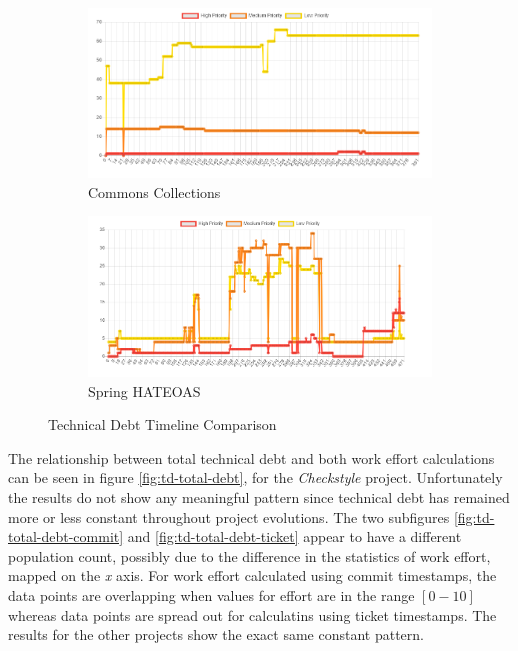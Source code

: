\documentclass{mpaper}
\begin{document}
\begin{figure}
	\centering
	\begin{subfigure}{.45\textwidth}
		\includegraphics[width=\linewidth]{images/collections_td_timeline.png}
		\caption{Commons Collections}
		\label{fig:collections-td-timeline}
	\end{subfigure}
	\begin{subfigure}{.45\textwidth}
		\includegraphics[width=\linewidth]{images/spring_td_timeline.png}
		\caption{Spring HATEOAS}
		\label{fig:spring-td-timeline}
	\end{subfigure}
	\caption{Technical Debt Timeline Comparison}
	\label{fig:td-timeline}
\end{figure}

The relationship between total technical debt and both work effort calculations
can be seen in figure \ref{fig:td-total-debt}, for the \emph{Checkstyle}
project. Unfortunately the results do not show any meaningful pattern since
technical debt has remained more or less constant throughout project evolutions.
The two subfigures \ref{fig:td-total-debt-commit} and
\ref{fig:td-total-debt-ticket} appear to have a different population count,
possibly due to the difference in the statistics of work effort, mapped on the
\emph{x} axis. For work effort calculated using commit timestamps, the data
points are overlapping when values for effort are in the range $[0-10]$ whereas
data points are spread out for calculatins using ticket timestamps. The results
for the other projects show the exact same constant pattern. 
\end{document}
